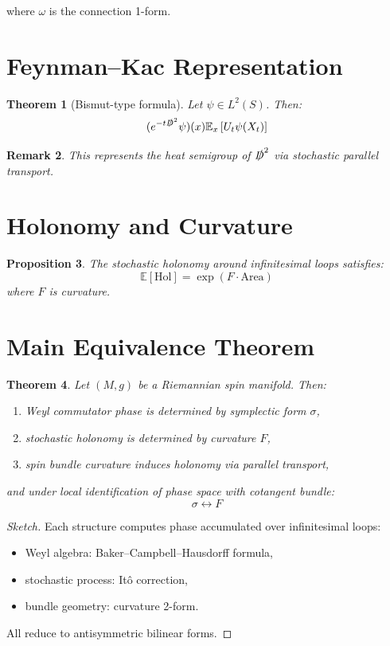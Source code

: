 \documentclass[11pt]{article}
\newtheorem{theorem}{Theorem}[section]
\newtheorem{proposition}[theorem]{Proposition}
\newtheorem{remark}[theorem]{Remark}
\begin{document}
where $\omega$ is the connection 1-form.

\section{Feynman--Kac Representation}

\begin{theorem}[Bismut-type formula]
Let $\psi \in L^2(S)$. Then:
\[
(e^{-t \slashed{D}^2}\psi)(x)
\mathbb{E}_x \left[
U_t \psi(X_t)
\right]
\]
\end{theorem}

\begin{remark}
This represents the heat semigroup of $\slashed{D}^2$ via stochastic parallel transport.
\end{remark}

\section{Holonomy and Curvature}

\begin{proposition}
The stochastic holonomy around infinitesimal loops satisfies:
\[
\mathbb{E}[\text{Hol}] = \exp(F \cdot \text{Area})
\]
where $F$ is curvature.
\end{proposition}

\section{Main Equivalence Theorem}

\begin{theorem}
Let $(M,g)$ be a Riemannian spin manifold. Then:

\begin{enumerate}
\item Weyl commutator phase is determined by symplectic form $\sigma$,
\item stochastic holonomy is determined by curvature $F$,
\item spin bundle curvature induces holonomy via parallel transport,
\end{enumerate}

and under local identification of phase space with cotangent bundle:
\[
\sigma \leftrightarrow F
\]

\end{theorem}

\begin{proof}[Sketch]
Each structure computes phase accumulated over infinitesimal loops:

\begin{itemize}
\item Weyl algebra: Baker–Campbell–Hausdorff formula,
\item stochastic process: Itô correction,
\item bundle geometry: curvature 2-form.
\end{itemize}

All reduce to antisymmetric bilinear forms.
\end{proof}
\end{document}
